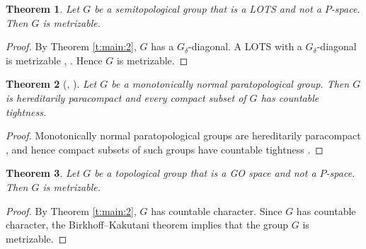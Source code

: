 \documentclass[preprint]{elsarticle}
\def\de{\delta}
\newtheorem{theorem}{Theorem}[section]
\theoremstyle{definition}
\theoremstyle{remark}
\def\si{\sigma}
\begin{document}
\begin{theorem}\label{t:main:3}
Let $G$ be a semitopological group that is a LOTS and not a $P$-space.
Then $G$ is metrizable.
\end{theorem}
\begin{proof}
By Theorem \ref{t:main:2}, $G$ has a $G_\de$-diagonal.
A LOTS with a $G_\de$-diagonal is metrizable \cite{Lutzer1969}, \cite[Theorem 2.3]{gru1984}.
Hence $G$ is metrizable.
\end{proof}


\begin{theorem}[{\cite[Theorem 2.6]{BuzyakovaVural2014}, \cite[Theorem 3.5]{WilliamsZhou1998}}]
\label{t:main:3+1}
Let $G$ be a monotonically normal paratopological group. Then $G$ is hereditarily paracompact and every compact subset of $G$ has countable tightness.
\end{theorem}
\begin{proof}
Monotonically normal paratopological groups are hereditarily paracompact \cite[Theorem 2.6]{BuzyakovaVural2014}, and hence compact subsets of such groups have countable tightness \cite[Theorem 3.5]{WilliamsZhou1998}.
\end{proof}




\begin{theorem}\label{t:main:2+1}
Let $G$ be a topological group that is a GO space and not a $P$-space.
Then $G$ is metrizable.
\end{theorem}
\begin{proof}
By Theorem \ref{t:main:2}, $G$ has countable character. Since $G$ has countable character, the Birkhoff--Kakutani theorem \cite[Theorem 3.3.12]{at2009} implies that the group $G$ is metrizable.
\end{proof}
\end{document}
